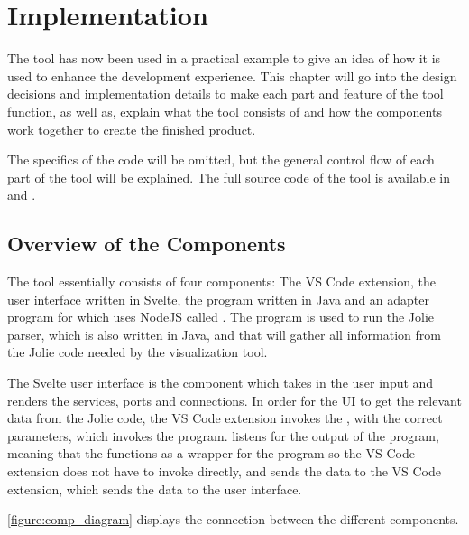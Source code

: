 \chapter{Implementation}
The tool has now been used in a practical example to give an idea of how it is used to enhance the development experience.
This chapter will go into the design decisions and implementation details to make each part and feature of the tool function, as well as,
explain what the tool consists of and how the components work together to create the finished product.

The specifics of the code will be omitted, but the general control flow of each part of the tool will be explained. The full source code of the tool
is available in \cite{jv} and \cite{vscode-jv}. 

\section{Overview of the Components}
The tool essentially consists of four components: The VS Code extension, the user interface written in Svelte, the \javatoolname[] program written in Java and an adapter program for \javatoolname[] which uses NodeJS called \nodetoolname[].
The \javatoolname[] program is used to run the Jolie parser, which is also written in Java, and that will gather all information from the Jolie code needed by the visualization tool.

The Svelte user interface is the component which takes in the user input and renders the services, ports and connections.
In order for the UI to get the relevant data from the Jolie code, the VS Code extension invokes the \nodetoolname[], with the correct parameters, which invokes the \javatoolname[] program.
\nodetoolname[] listens for the output of the \javatoolname[] program,
meaning that the \nodetoolname[] functions as a wrapper for the \javatoolname[] program so the VS Code extension does not have to invoke \javatoolname[] directly,
and sends the data to the VS Code extension, which sends the data to the user interface.

\cref{figure:comp_diagram} displays the connection between the different components.

